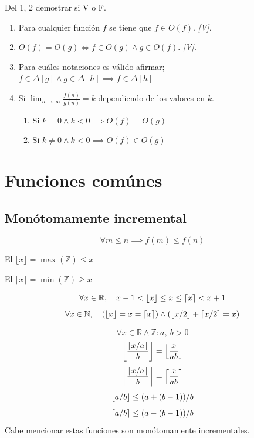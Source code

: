 \documentclass[tikz,11pt,fleqn]{book} %
\begin{document}
\begin{example}[Ejercicio]
    Del 1, 2 demostrar si V o F.
    \begin{enumerate}
        \item Para cualquier función $f$ se tiene que $f\in O(f)$. \textit{[V].}
        \item $O(f)=O(g)\iff f\in O(g)\land g\in O(f)$. \textit{[V].}
        \item Para cuáles notaciones es válido afirmar; $f\in \Delta[g]\land g\in\Delta[h]\implies f\in\Delta[h]$
        \item Si $\lim_{n\to\infty}\frac{f(n)}{g(n)}=k$ dependiendo de los valores en $k$.
        \begin{enumerate}
            \item Si $k=0\land k<0\implies O(f)=O(g)$
            \item Si $k\neq0\land k<0\implies O(f)\in O(g)$
        \end{enumerate}
    \end{enumerate}
\end{example}





\section{Funciones comúnes}
\subsection{Monótomamente incremental}
\begin{definition}
    $$\forall m\le   n \implies f(m)\le  f(n)$$
\end{definition}

\begin{definition}
    El $\lfloor x\rfloor=\max(\mathbb{Z})\le x$
\end{definition}
\begin{definition}
    El $\lceil x\rceil=\min(\mathbb{Z})\ge x$
\end{definition}
$$
    \forall x\in\mathbb{R},\quad x-1<\left\lfloor x \right\rfloor\le x\le \left\lceil x \right\rceil<x+1
$$ $$
    \forall x\in\mathbb{N},\quad (\left\lfloor x \right\rfloor=x= \left\lceil x \right\rceil)\land (\left\lfloor x/2 \right\rfloor+\left\lceil x/2 \right\rceil=x)
$$
\begin{theorem}
    $$\forall x\in\mathbb R \land \mathbb Z:a,~b>0 $$
    $$ \left\lfloor \frac{\left\lfloor x/a \right\rfloor}b \right\rfloor=\left\lfloor \frac x{ab} \right\rfloor $$
    $$ \left\lceil \frac{\left\lceil x/a \right\rceil}b \right\rceil=\left\lceil \frac x{ab} \right\rceil $$
    $$ \left\lfloor a/b \right\rfloor\le (a+(b-1))/b $$
    $$ \left\lceil a/b \right\rceil\le (a-(b-1))/b $$
    Cabe mencionar estas funciones son monótomamente incrementales.
\end{theorem}
\end{document}
